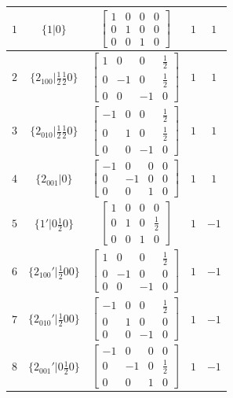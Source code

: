 \documentclass[fleqn,8pt]{jsarticle}
\begin{document}
\begin{longtable}{ccccc}
$ 1 $ & $ \{1|0\} $ & $ \begin{bmatrix} 1 & 0 & 0 & 0 \\ 0 & 1 & 0 & 0 \\ 0 & 0 & 1 & 0 \end{bmatrix} $ & $ 1 $ & $ 1 $ \\ \hline
$ 2 $ & $ \{2{}_{100}|\frac{1}{2} \frac{1}{2} 0\} $ & $ \begin{bmatrix} 1 & 0 & 0 & \frac{1}{2} \\ 0 & -1 & 0 & \frac{1}{2} \\ 0 & 0 & -1 & 0 \end{bmatrix} $ & $ 1 $ & $ 1 $ \\ \hline
$ 3 $ & $ \{2{}_{010}|\frac{1}{2} \frac{1}{2} 0\} $ & $ \begin{bmatrix} -1 & 0 & 0 & \frac{1}{2} \\ 0 & 1 & 0 & \frac{1}{2} \\ 0 & 0 & -1 & 0 \end{bmatrix} $ & $ 1 $ & $ 1 $ \\ \hline
$ 4 $ & $ \{2{}_{001}|0\} $ & $ \begin{bmatrix} -1 & 0 & 0 & 0 \\ 0 & -1 & 0 & 0 \\ 0 & 0 & 1 & 0 \end{bmatrix} $ & $ 1 $ & $ 1 $ \\ \hline
$ 5 $ & $ \{1{}'|0 \frac{1}{2} 0\} $ & $ \begin{bmatrix} 1 & 0 & 0 & 0 \\ 0 & 1 & 0 & \frac{1}{2} \\ 0 & 0 & 1 & 0 \end{bmatrix} $ & $ 1 $ & $ -1 $ \\ \hline
$ 6 $ & $ \{2{}_{100}{}'|\frac{1}{2} 0 0\} $ & $ \begin{bmatrix} 1 & 0 & 0 & \frac{1}{2} \\ 0 & -1 & 0 & 0 \\ 0 & 0 & -1 & 0 \end{bmatrix} $ & $ 1 $ & $ -1 $ \\ \hline
$ 7 $ & $ \{2{}_{010}{}'|\frac{1}{2} 0 0\} $ & $ \begin{bmatrix} -1 & 0 & 0 & \frac{1}{2} \\ 0 & 1 & 0 & 0 \\ 0 & 0 & -1 & 0 \end{bmatrix} $ & $ 1 $ & $ -1 $ \\ \hline
$ 8 $ & $ \{2{}_{001}{}'|0 \frac{1}{2} 0\} $ & $ \begin{bmatrix} -1 & 0 & 0 & 0 \\ 0 & -1 & 0 & \frac{1}{2} \\ 0 & 0 & 1 & 0 \end{bmatrix} $ & $ 1 $ & $ -1 $ \\
\end{longtable}
\end{document}
